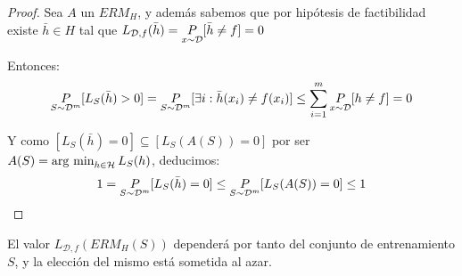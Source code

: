   \begin{proof}
  Sea $A$ un $ERM_H$, y además sabemos que por hipótesis de factibilidad existe $\bar{h} \in H$ tal que
  $L_{\mathcal{D},f}(\bar{h}) = \underset{x\sim \mathcal{D}}{P}[\bar{h}\neq f] = 0$

  Entonces: \[\underset{S\sim \mathcal{D}^m}{P}[L_S(\bar{h}) > 0] = \underset{S\sim \mathcal{D}^m}{P}
  [\exists i: \bar{h}(x_i) \neq f(x_i)] \le \sum_{i=1}^m \underset{x\sim \mathcal{D}}{P}[h\neq f] = 0\]

  Y como $[L_S(\bar{h}) = 0] \subseteq [L_S(A(S)) = 0]$ por ser $A(S) = \operatorname*{arg\,\min}_{h\in \mathcal{H}} L_S(h)$, deducimos:
  \[1 = \underset{S\sim \mathcal{D}^m}{P}[L_S(\bar{h}) = 0] \le \underset{S\sim \mathcal{D}^m}{P}[L_S(A(S)) = 0] \le 1\]
  \end{proof}

El valor $L_{\mathcal{D},f}(ERM_H(S))$ dependerá por tanto del conjunto de entrenamiento $S$, y la elección del
mismo está sometida al azar. 

